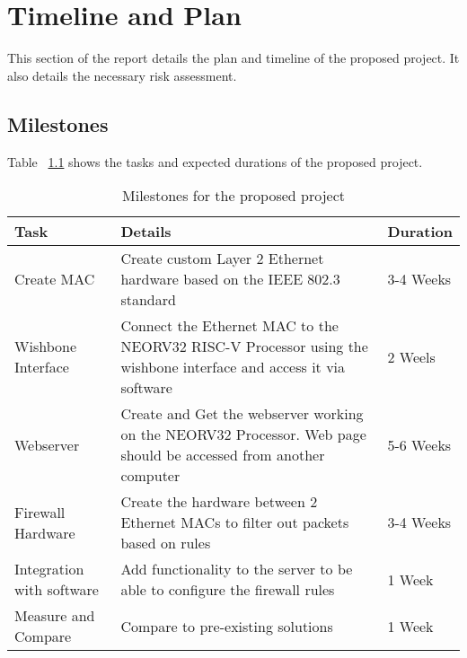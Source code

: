 
\chapter[Timeline and Plan]{Timeline and Plan}
\label{Chap:label}	%
\pagestyle{headings}



This section of the report details the plan and timeline of the proposed project. It also details the necessary risk assessment.


\section{Milestones}
\label{Sec:label}	%

Table ~\ref{table:milestones} shows the tasks and expected durations of the proposed project.
  

\begin{table}[hbt!]
\centering%
    \begin{tabularx}{\textwidth}{ lXl }
        \hline
        Task                            & Details & Duration  \\ \hline
        Create MAC                      &  Create custom Layer 2 Ethernet hardware based on the IEEE 802.3 standard      & 3-4 Weeks \\
        Wishbone Interface              &  Connect the Ethernet MAC to the NEORV32 RISC-V Processor using the wishbone interface and access it via software       & 2 Weels   \\
        Webserver                       &  Create and Get the webserver working on the NEORV32 Processor. Web page should be accessed from another computer       & 5-6 Weeks \\ 
        Firewall Hardware               &  Create the hardware between 2 Ethernet MACs to filter out packets based on rules      & 3-4 Weeks \\ 
        Integration with software       &  Add functionality to the server to be able to configure the firewall rules       & 1 Week \\ 
        Measure and Compare             &  Compare to pre-existing solutions       & 1 Week \\ 
        \hline
        \end{tabularx}
\caption{ Milestones for the proposed project}\label{table:milestones}
\end{table}
 

